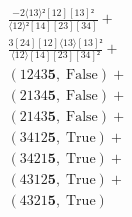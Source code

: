\documentclass[varwidth, border=5pt]{standalone}
\begin{document}
\begin{my}
$\begin{gathered}
\scriptscriptstyle\frac{-2⟨13⟩²[12][13]²}{⟨12⟩²[14][23][34]} +\\
\scriptscriptstyle\frac{3[24][12]⟨13⟩[13]²}{⟨12⟩[14][23][34]²} +\\
\scriptscriptstyle(1243𝟓,\;\text{False}) +\\
\scriptscriptstyle(2134𝟓,\;\text{False}) +\\
\scriptscriptstyle(2143𝟓,\;\text{False}) +\\
\scriptscriptstyle(3412𝟓,\;\text{True}) +\\
\scriptscriptstyle(3421𝟓,\;\text{True}) +\\
\scriptscriptstyle(4312𝟓,\;\text{True}) +\\
\scriptscriptstyle(4321𝟓,\;\text{True}) \phantom{+}
\end{gathered}$
\end{my}
\end{document}
